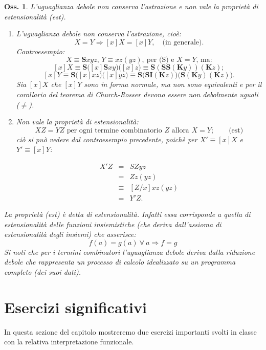 \documentclass{book}
\newtheorem{osservazione}{Oss.}[chapter]
\newcommand*{\ii}{\mathbf{I}}    %
\newcommand*{\kk}{\mathbf{K}}    %
\newcommand*{\sss}{\mathbf{S}}   %
\begin{document}
\begin{osservazione}
\label{est}
L'uguaglianza debole non conserva l'astrazione e non vale la propriet\`a di
estensionalit\`a (est).
\begin{enumerate}
\item[a)]L'uguaglianza debole non conserva l'astrazione, cio\`e:
  \[ 
  X = Y \Longrightarrow [x]X = [x]Y, \quad \text{(in generale).} 
  \]
  Controesempio:
  \[ 
  X \equiv \sss xyz \text{, } Y \equiv xz(yz), \ \text{per (S) e 
  $X = Y$,  ma:} 
  \]
  \[ 
  [x]X \equiv \sss\bigl([x]\sss xy\bigr)\bigl([x]z\bigr) \equiv 
  \sss(\sss\sss(\kk y))(\kk z); 
  \]
  \[ 
  [x]Y \equiv \sss\bigl([x]xz\bigr)\bigl([x]yz\bigr) \equiv 
  \sss\bigl(\sss\ii(\kk z)\bigr)\bigl(\sss(\kk y)(\kk z)\bigr). 
  \]
  Sia $[x]X$ che $[x]Y$ sono in forma normale, ma non sono 
  equivalenti e per il corollario del teorema di Church-Rosser devono essere
  non debolmente uguali ($\neq$).
\item[b)]Non vale la propriet\`a di estensionalit\`a:
  \[ XZ = YZ \text{ per ogni termine combinatorio } Z \text{ allora } X = Y;
  \qquad \text{(est)} \]
  ci\`o si pu\`o vedere dal controesempio precedente, poich\`e per 
  $X' \equiv [x]X$ e $Y' \equiv [x]Y$:

  \[
   \begin{array}{lcl}
    X'Z & = & SZyz \\
        & = & Zz(yz) \\
        & \equiv & [Z/x]xz(yz) \\
        & = & Y'Z.
  \end{array}
  \]

\end{enumerate}
La propriet\`a (est) \`e detta di \emph{estensionalit\`a}. Infatti essa
corrisponde a quella di estensionalit\`a delle funzioni insiemistiche (che
deriva dall'assioma di estensionalit\`a degli insiemi) che asserisce:
\[ f(a) = g(a) \ \forall \ a \Longrightarrow f = g \]
Si noti che per i termini combinatori l'uguaglianza debole deriva dalla 
riduzione debole che rappresenta un processo di calcolo idealizzato su un 
programma completo (dei suoi dati). 
\end{osservazione}

\section{Esercizi significativi}
In questa sezione del capitolo mostreremo due esercizi importanti svolti in 
classe con la relativa interpretazione funzionale.
\end{document}
